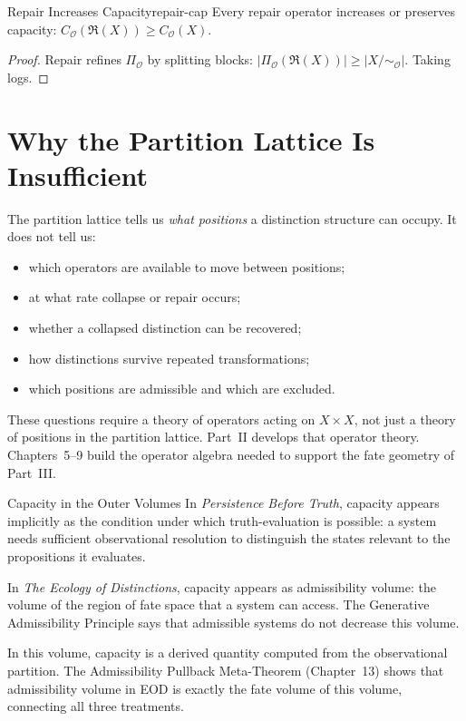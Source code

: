 \documentclass[12pt,twoside,openright]{book}
\newcommand{\repair}{\mathfrak{R}}        %
\newcommand{\distPairs}{X\times X}
\newcommand{\obs}{\mathcal{O}}
\providecommand{\partitionObs}{\Pi_{\obs}}
\providecommand{\quotientObs}{X/{\sim_{\obs}}}
\providecommand{\capObs}[1]{C_{\obs}(#1)}
\begin{document}
\begin{theorem}{Repair Increases Capacity}{repair-cap}
Every repair operator increases or preserves capacity:
$C_\obs(\repair(X))\ge\capObs{X}$.
\begin{proof}
Repair refines $\partitionObs$ by splitting blocks:
$|\Pi_\obs(\repair(X))|\ge|\quotientObs|$. Taking logs.
\end{proof}
\end{theorem}

\section{Why the Partition Lattice Is Insufficient}

The partition lattice tells us \emph{what positions} a
distinction structure can occupy. It does not tell us:

\begin{itemize}[nosep,leftmargin=2em]
\item which operators are available to move between positions;
\item at what rate collapse or repair occurs;
\item whether a collapsed distinction can be recovered;
\item how distinctions survive repeated transformations;
\item which positions are admissible and which are excluded.
\end{itemize}

These questions require a theory of operators acting on
$\distPairs$, not just a theory of positions in the partition
lattice. Part~II develops that operator theory. Chapters~5--9
build the operator algebra needed to support the fate geometry
of Part~III.

\begin{trilogylink}{Capacity in the Outer Volumes}
In \textit{Persistence Before Truth}, capacity appears implicitly
as the condition under which truth-evaluation is possible: a
system needs sufficient observational resolution to distinguish
the states relevant to the propositions it evaluates.

In \textit{The Ecology of Distinctions}, capacity appears as
admissibility volume: the volume of the region of fate space
that a system can access. The Generative Admissibility
Principle says that admissible systems do not decrease this
volume.

In this volume, capacity is a derived quantity computed from
the observational partition. The Admissibility Pullback
Meta-Theorem (Chapter~13) shows that admissibility volume in
EOD is exactly the fate volume of this volume, connecting all
three treatments.
\end{trilogylink}
\end{document}
